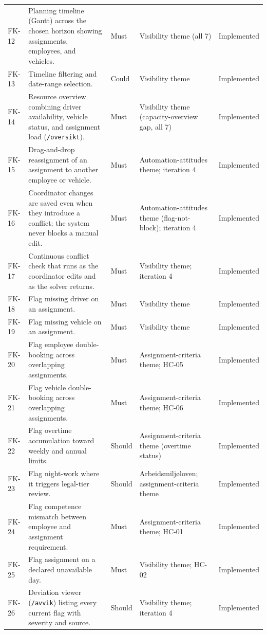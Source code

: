 \begin{footnotesize}
\begin{longtable}{@{}p{}p{}p{}p{}p{}@{}}
FK-12 & Planning timeline (Gantt) across the chosen horizon showing assignments, employees, and vehicles. & Must & Visibility theme (all 7) & Implemented \\
FK-13 & Timeline filtering and date-range selection. & Could & Visibility theme & Implemented \\
FK-14 & Resource overview combining driver availability, vehicle status, and assignment load (\texttt{/oversikt}). & Must & Visibility theme (capacity-overview gap, all 7) & Implemented \\
FK-15 & Drag-and-drop reassignment of an assignment to another employee or vehicle. & Must & Automation-attitudes theme; iteration 4 & Implemented \\
FK-16 & Coordinator changes are saved even when they introduce a conflict; the system never blocks a manual edit. & Must & Automation-attitudes theme (flag-not-block); iteration 4 & Implemented \\
FK-17 & Continuous conflict check that runs as the coordinator edits and as the solver returns. & Must & Visibility theme; iteration 4 & Implemented \\
FK-18 & Flag missing driver on an assignment. & Must & Visibility theme & Implemented \\
FK-19 & Flag missing vehicle on an assignment. & Must & Visibility theme & Implemented \\
FK-20 & Flag employee double-booking across overlapping assignments. & Must & Assignment-criteria theme; HC-05 & Implemented \\
FK-21 & Flag vehicle double-booking across overlapping assignments. & Must & Assignment-criteria theme; HC-06 & Implemented \\
FK-22 & Flag overtime accumulation toward weekly and annual limits. & Should & Assignment-criteria theme (overtime status) & Implemented \\
FK-23 & Flag night-work where it triggers legal-tier review. & Should & Arbeidsmiljøloven; assignment-criteria theme & Implemented \\
FK-24 & Flag competence mismatch between employee and assignment requirement. & Must & Assignment-criteria theme; HC-01 & Implemented \\
FK-25 & Flag assignment on a declared unavailable day. & Must & Visibility theme; HC-02 & Implemented \\
FK-26 & Deviation viewer (\texttt{/avvik}) listing every current flag with severity and source. & Should & Visibility theme; iteration 4 & Implemented \\

\end{longtable}
\end{footnotesize}
